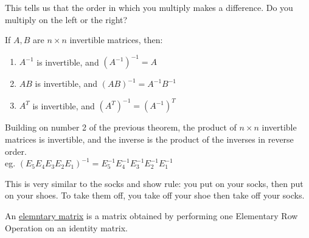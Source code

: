 \documentclass{report}
\begin{document}
This tells us that the order in which you multiply makes a difference. Do you multiply on the left or the right?

\begin{theorem}
If $A, B$ are $n\times n$ invertible matrices, then:
\begin{enumerate}
	\item $A^{-1}$ is invertible, and $(A^{-1})^{-1}=A$
	\item $AB$ is invertible, and $(AB)^{-1}=A^{-1}B^{-1}$
	\item $A^{T}$ is invertible, and $(A^{T})^{-1}=(A^{-1})^T$
\end{enumerate}
\end{theorem}

\begin{theorem}
Building on number 2 of the previous theorem, the product of $n\times n$ invertible matrices is invertible, and the inverse is the product of the inverses in reverse order.\\
\bigskip
eg. $(E_5E_4E_3E_2E_1)^{-1}=E_5^{-1}E_4^{-1}E_3^{-1}E_2^{-1}E_1^{-1}$
\end{theorem}

This is very similar to the socks and show rule: you put on your socks, then put on your shoes. To take them off, you take off your shoe then take off your socks.

\begin{definition}
An \underline{elemntary matrix} is a matrix obtained by performing one Elementary Row Operation on an identity matrix.
\end{definition}
\end{document}
